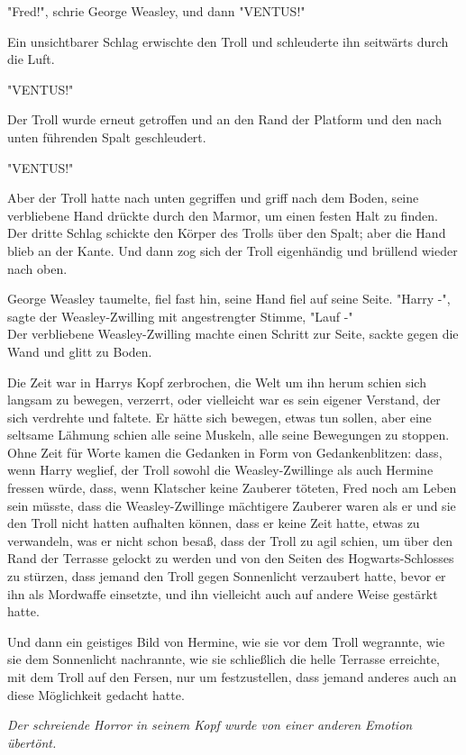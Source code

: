 {"Fred!", schrie George Weasley, und dann "VENTUS!"

Ein unsichtbarer Schlag erwischte den Troll und schleuderte ihn seitwärts durch die Luft.

"VENTUS!"

Der Troll wurde erneut getroffen und an den Rand der Platform und den nach unten führenden Spalt geschleudert.

"VENTUS!"

Aber der Troll hatte nach unten gegriffen und griff nach dem Boden, seine verbliebene Hand drückte durch den Marmor, um einen festen Halt zu finden. Der dritte Schlag schickte den Körper des Trolls über den Spalt; aber die Hand blieb an der Kante. Und dann zog sich der Troll eigenhändig und brüllend wieder nach oben.

George Weasley taumelte, fiel fast hin, seine Hand fiel auf seine Seite. "Harry -", sagte der Weasley-Zwilling mit angestrengter Stimme, "Lauf -"\\ Der verbliebene Weasley-Zwilling machte einen Schritt zur Seite, sackte gegen die Wand und glitt zu Boden.

Die Zeit war in Harrys Kopf zerbrochen, die Welt um ihn herum schien sich langsam zu bewegen, verzerrt, oder vielleicht war es sein eigener Verstand, der sich verdrehte und faltete. Er hätte sich bewegen, etwas tun sollen, aber eine seltsame Lähmung schien alle seine Muskeln, alle seine Bewegungen zu stoppen. Ohne Zeit für Worte kamen die Gedanken in Form von Gedankenblitzen: dass, wenn Harry weglief, der Troll sowohl die Weasley-Zwillinge als auch Hermine fressen würde, dass, wenn Klatscher keine Zauberer töteten, Fred noch am Leben sein müsste, dass die Weasley-Zwillinge mächtigere Zauberer waren als er und sie den Troll nicht hatten aufhalten können, dass er keine Zeit hatte, etwas zu verwandeln, was er nicht schon besaß, dass der Troll zu agil schien, um über den Rand der Terrasse gelockt zu werden und von den Seiten des Hogwarts-Schlosses zu stürzen, dass jemand den Troll gegen Sonnenlicht verzaubert hatte, bevor er ihn als Mordwaffe einsetzte, und ihn vielleicht auch auf andere Weise gestärkt hatte.

Und dann ein geistiges Bild von Hermine, wie sie vor dem Troll wegrannte, wie sie dem Sonnenlicht nachrannte, wie sie schließlich die helle Terrasse erreichte, mit dem Troll auf den Fersen, nur um festzustellen, dass jemand anderes auch an diese Möglichkeit gedacht hatte.

\emph{Der schreiende Horror in seinem Kopf wurde von einer anderen Emotion übertönt.}

}
